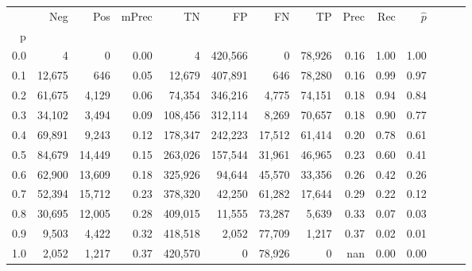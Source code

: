 \begin{tabular}{rrrrrrrrrrrrrr}
\toprule
{} &     Neg &     Pos & mPrec &       TN &       FP &      FN &      TP &  Prec &   Rec & $\hat{p}$ \\
p   &         &         &       &          &          &         &         &       &       &           \\
\midrule
0.0 &       4 &       0 &  0.00 &        4 &  420,566 &       0 &  78,926 &  0.16 &  1.00 &      1.00 \\
0.1 &  12,675 &     646 &  0.05 &   12,679 &  407,891 &     646 &  78,280 &  0.16 &  0.99 &      0.97 \\
0.2 &  61,675 &   4,129 &  0.06 &   74,354 &  346,216 &   4,775 &  74,151 &  0.18 &  0.94 &      0.84 \\
0.3 &  34,102 &   3,494 &  0.09 &  108,456 &  312,114 &   8,269 &  70,657 &  0.18 &  0.90 &      0.77 \\
0.4 &  69,891 &   9,243 &  0.12 &  178,347 &  242,223 &  17,512 &  61,414 &  0.20 &  0.78 &      0.61 \\
0.5 &  84,679 &  14,449 &  0.15 &  263,026 &  157,544 &  31,961 &  46,965 &  0.23 &  0.60 &      0.41 \\
0.6 &  62,900 &  13,609 &  0.18 &  325,926 &   94,644 &  45,570 &  33,356 &  0.26 &  0.42 &      0.26 \\
0.7 &  52,394 &  15,712 &  0.23 &  378,320 &   42,250 &  61,282 &  17,644 &  0.29 &  0.22 &      0.12 \\
0.8 &  30,695 &  12,005 &  0.28 &  409,015 &   11,555 &  73,287 &   5,639 &  0.33 &  0.07 &      0.03 \\
0.9 &   9,503 &   4,422 &  0.32 &  418,518 &    2,052 &  77,709 &   1,217 &  0.37 &  0.02 &      0.01 \\
1.0 &   2,052 &   1,217 &  0.37 &  420,570 &        0 &  78,926 &       0 &   nan &  0.00 &      0.00 \\
\bottomrule
\end{tabular}
